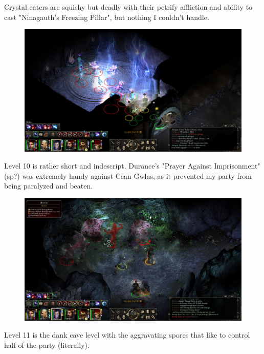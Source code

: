 \documentclass{article}
\begin{document}
Crystal eaters are squishy but deadly with their petrify affliction and ability to cast "Ninagauth's Freezing Pillar", but nothing I couldn't handle.

\begin{figure}
\includegraphics[scale=0.33]{files/blog/2018_11_25_pillars_of_eternity_path_of_the_damned_act_ii/2018_11_25_paths_l10.jpg}
\end{figure}

Level 10 is rather short and indescript.  Durance's "Prayer Against Imprisonment" (sp?) was extremely handy against Cean Gwlas, as it prevented my party from being paralyzed and beaten.

\begin{figure}
\includegraphics[scale=0.33]{files/blog/2018_11_25_pillars_of_eternity_path_of_the_damned_act_ii/2018_11_25_paths_l11_1.jpg}
\end{figure}

Level 11 is the dank cave level with the aggravating spores that like to control half of the party (literally).
\end{document}
